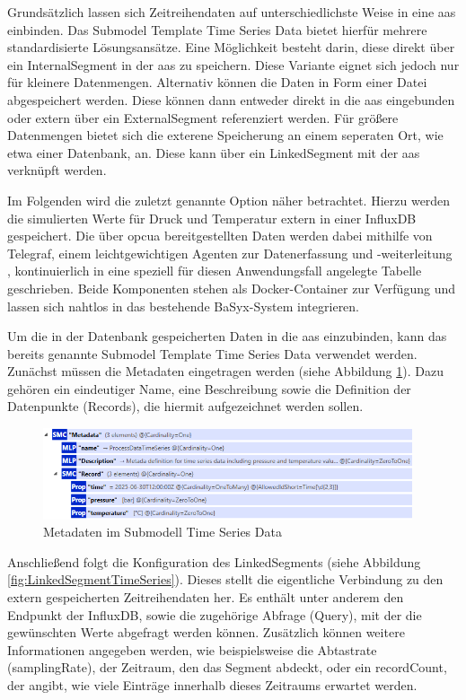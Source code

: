 Grundsätzlich lassen sich Zeitreihendaten auf unterschiedlichste Weise in eine \acs{aas} einbinden.
Das Submodel Template Time Series Data \cite{SpezifikationTimeSeriesData} bietet hierfür mehrere standardisierte Lösungsansätze.
Eine Möglichkeit besteht darin, diese direkt über ein InternalSegment in der \acs{aas} zu speichern.
Diese Variante eignet sich jedoch nur für kleinere Datenmengen.
Alternativ können die Daten in Form einer Datei abgespeichert werden.
Diese können dann entweder direkt in die \acs{aas} eingebunden oder extern über ein ExternalSegment referenziert werden.
Für größere Datenmengen bietet sich die exterene Speicherung an einem seperaten Ort, wie etwa einer Datenbank, an.
Diese kann über ein LinkedSegment mit der \acs{aas} verknüpft werden.

Im Folgenden wird die zuletzt genannte Option näher betrachtet.
Hierzu werden die simulierten Werte für Druck und Temperatur extern in einer InfluxDB gespeichert.
Die über \acs{opcua} bereitgestellten Daten werden dabei mithilfe von Telegraf, einem leichtgewichtigen Agenten zur Datenerfassung und -weiterleitung \cite{Influx}, kontinuierlich in eine speziell für diesen Anwendungsfall angelegte Tabelle geschrieben.
Beide Komponenten stehen als Docker-Container zur Verfügung und lassen sich nahtlos in das bestehende BaSyx-System integrieren.

Um die in der Datenbank gespeicherten Daten in die \acs{aas} einzubinden, kann das bereits genannte Submodel Template Time Series Data verwendet werden.
Zunächst müssen die Metadaten eingetragen werden (siehe Abbildung \ref{fig:MetadataTimeSeries}).
Dazu gehören ein eindeutiger Name, eine Beschreibung sowie die Definition der Datenpunkte (Records), die hiermit aufgezeichnet werden sollen.

\begin{figure}[htbp]
    \centering
    \includegraphics[width=0.97\textwidth]{Bilder/TimeSeries/MetadataTimeSeries.PNG}
    \caption{Metadaten im Submodell Time Series Data}
    \label{fig:MetadataTimeSeries}
\end{figure}

Anschließend folgt die Konfiguration des LinkedSegments (siehe Abbildung \ref{fig:LinkedSegmentTimeSeries}). 
Dieses stellt die eigentliche Verbindung zu den extern gespeicherten Zeitreihendaten her.
Es enthält unter anderem den Endpunkt der InfluxDB, sowie die zugehörige Abfrage (Query), mit der die gewünschten Werte abgefragt werden können.
Zusätzlich können weitere Informationen angegeben werden, wie beispielsweise die Abtastrate (samplingRate), der Zeitraum, den das Segment abdeckt, oder ein recordCount, der angibt, wie viele Einträge innerhalb dieses Zeitraums erwartet werden.

